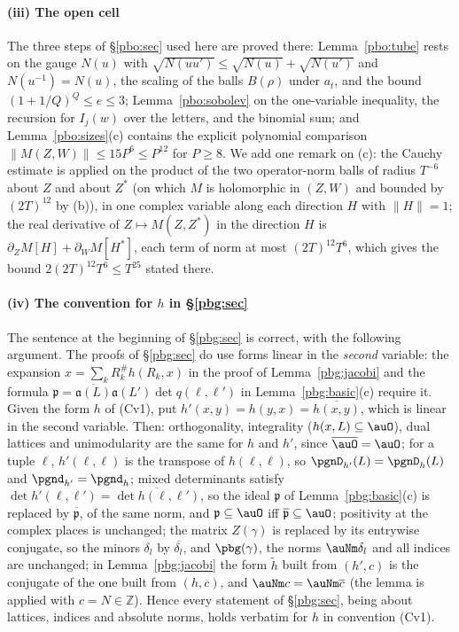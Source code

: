 \documentclass[10pt]{amsart}
\theoremstyle{definition}
\theoremstyle{remark}
\newcommand{\Z}{\mathbb Z}
\providecommand{\aubar}[1]{\overline{#1}}
\begin{document}
\paragraph*{(iii) The open cell}
The three steps of \S\ref{pbo:sec} used here are proved there: Lemma~\ref{pbo:tube} rests on the gauge $N(u)$ with $\sqrt{N(uu')}\le\sqrt{N(u)}+\sqrt{N(u')}$ and $N(u^{-1})=N(u)$, the scaling of the
balls $B(\rho)$ under $a_t$, and the bound $(1+1/Q)^Q\le e\le3$; Lemma~\ref{pbo:sobolev} on
the one-variable inequality, the recursion for $I_j(w)$ over the letters, and the binomial sum; and
Lemma~\ref{pbo:sizes}(c) contains the explicit polynomial comparison $\|M(Z,W)\|\le15P^6\le P^{12}$ for $P\ge8$.
We add one remark on (c): the Cauchy estimate is applied on the product of the two
operator-norm balls of radius $T^{-6}$ about $Z$ and about $Z^*$ (on which $M$ is holomorphic in $(Z,W)$ and
bounded by $(2T)^{12}$ by (b)), in one complex variable along each direction $H$ with $\|H\|=1$; the real
derivative of $Z\mapsto M(Z,Z^*)$ in the direction $H$ is $\partial_ZM[H]+\partial_WM[H^*]$, each term of norm
at most $(2T)^{12}T^6$, which gives the bound $2(2T)^{12}T^6\le T^{25}$ stated there.

\paragraph*{(iv) The convention for $h$ in \S\ref{pbg:sec}}
The sentence at the beginning of \S\ref{pbg:sec} is correct, with the following argument. The proofs of
\S\ref{pbg:sec} do use forms linear in the \emph{second} variable: the expansion $x=\sum_kR^\#_kh(R_k,x)$ in the
proof of Lemma~\ref{pbg:jacobi} and the formula $\mathfrak p=\aubar{\mathfrak a(L)}\mathfrak a(L')\det q(\ell,\ell')$
in Lemma~\ref{pbg:basic}(c) require it. Given the form $h$ of (Cv1), put $h'(x,y)=h(y,x)=\aubar{h(x,y)}$, which is
linear in the second variable. Then: orthogonality, integrality ($h(x,L)\subseteq\auO$), dual lattices and
unimodularity are the same for $h$ and $h'$, since $\aubar\auO=\auO$; for a tuple $\ell$, $h'(\ell,\ell)$ is the
transpose of $h(\ell,\ell)$, so $\pgnD_{h'}(L)=\pgnD_h(L)$ and $\pgnd_{h'}=\pgnd_h$; mixed determinants satisfy
$\det h'(\ell,\ell')=\aubar{\det h(\ell,\ell')}$, so the ideal $\mathfrak p$ of Lemma~\ref{pbg:basic}(c) is replaced by
$\aubar{\mathfrak p}$, of the same norm, and $\mathfrak p\subseteq\auO$ iff $\aubar{\mathfrak p}\subseteq\auO$; positivity at the
complex places is unchanged; the matrix $Z(\gamma)$ is replaced by its entrywise conjugate, so the minors
$\delta_l$ by $\aubar{\delta_l}$, and $\pbg(\gamma)$, the norms $\auNm\delta_l$ and all indices are unchanged; in
Lemma~\ref{pbg:jacobi} the form $\tilde h$ built from $(h',c)$ is the conjugate of the one built from $(h,\aubar c)$,
and $\auNm c=\auNm\aubar c$ (the lemma is applied with $c=N\in\Z$). Hence every statement of \S\ref{pbg:sec},
being about lattices, indices and absolute norms, holds verbatim for $h$ in convention (Cv1).
\end{document}
